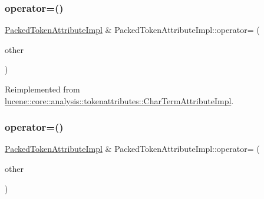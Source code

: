 \subsubsection{\texorpdfstring{operator=()}{operator=()}\hspace{0.1cm}{\footnotesize\ttfamily [1/2]}}
{\footnotesize\ttfamily \mbox{\hyperlink{classlucene_1_1core_1_1analysis_1_1tokenattributes_1_1PackedTokenAttributeImpl}{Packed\+Token\+Attribute\+Impl}} \& Packed\+Token\+Attribute\+Impl\+::operator= (\begin{DoxyParamCaption}\item[{\mbox{\hyperlink{ZlibCrc32_8h_a2c212835823e3c54a8ab6d95c652660e}{const}} \mbox{\hyperlink{classlucene_1_1core_1_1util_1_1AttributeImpl}{lucene\+::core\+::util\+::\+Attribute\+Impl}} \&}]{other }\end{DoxyParamCaption})\hspace{0.3cm}{\ttfamily [virtual]}}



Reimplemented from \mbox{\hyperlink{classlucene_1_1core_1_1analysis_1_1tokenattributes_1_1CharTermAttributeImpl_ac49b714c3f8e438ddaa27dc1a2421144}{lucene\+::core\+::analysis\+::tokenattributes\+::\+Char\+Term\+Attribute\+Impl}}.

\mbox{\label{classlucene_1_1core_1_1analysis_1_1tokenattributes_1_1PackedTokenAttributeImpl_a87fbfcbb26c03dc5fd6d6d51fc41e817}} 
\subsubsection{\texorpdfstring{operator=()}{operator=()}\hspace{0.1cm}{\footnotesize\ttfamily [2/2]}}
{\footnotesize\ttfamily \mbox{\hyperlink{classlucene_1_1core_1_1analysis_1_1tokenattributes_1_1PackedTokenAttributeImpl}{Packed\+Token\+Attribute\+Impl}} \& Packed\+Token\+Attribute\+Impl\+::operator= (\begin{DoxyParamCaption}\item[{\mbox{\hyperlink{ZlibCrc32_8h_a2c212835823e3c54a8ab6d95c652660e}{const}} \mbox{\hyperlink{classlucene_1_1core_1_1analysis_1_1tokenattributes_1_1PackedTokenAttributeImpl}{Packed\+Token\+Attribute\+Impl}} \&}]{other }\end{DoxyParamCaption})}

